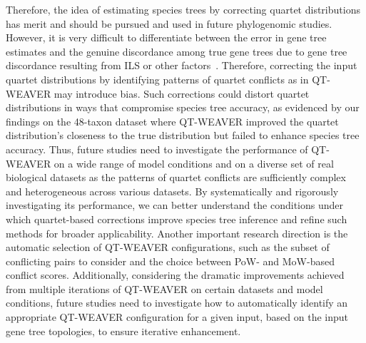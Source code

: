 \documentclass[10pt,a4paper]{article}
\newcommand{\addb}[1]{{\color{red} #1}}
\begin{document}
Therefore, the idea of estimating species trees by correcting  quartet distributions has merit and should be pursued and used in future phylogenomic studies. However, it is very difficult to differentiate between the error in gene tree estimates and the genuine discordance among true gene trees due to gene tree discordance resulting from ILS or other factors~\cite{maddison1997}. Therefore, correcting the input quartet distributions by identifying patterns of quartet conflicts as in QT-WEAVER may introduce bias. Such corrections could distort quartet distributions in ways that compromise species tree accuracy, as evidenced by our findings on the 48-taxon dataset where QT-WEAVER improved the quartet distribution's closeness to the true distribution but failed to enhance species tree accuracy. Thus, future studies need to investigate the performance of QT-WEAVER on a wide range of model conditions and on a diverse set of real biological datasets as the patterns of quartet conflicts are sufficiently complex and heterogeneous across various datasets. By systematically and rigorously investigating its performance, we can better understand the conditions under which quartet-based corrections improve species tree inference and refine such methods for broader applicability. Another important research direction is the automatic selection of QT-WEAVER configurations, such as the subset of conflicting pairs to consider and the choice between PoW- and MoW-based conflict scores. Additionally, considering the dramatic improvements achieved from multiple iterations of QT-WEAVER on certain datasets and model conditions, future studies need to investigate how to automatically identify an appropriate QT-WEAVER configuration for a given input, based on the input gene tree topologies, to ensure iterative enhancement.


\end{document}
